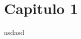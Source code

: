 \documentclass[Análisis.root.tex]{subfiles}
\begin{document}
    \section{Capitulo 1}
    asdasd
\end{document}
